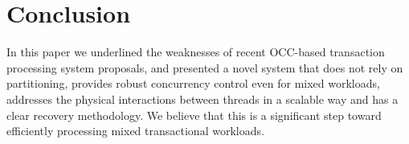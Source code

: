 
\section{Conclusion}

In this paper we underlined the weaknesses of recent OCC-based transaction processing system proposals, and presented a novel system that does not rely on partitioning, provides robust concurrency control even for mixed workloads, addresses the physical interactions between threads in a scalable way and has a clear recovery methodology.
We believe that this is a significant step toward efficiently processing mixed transactional workloads.
